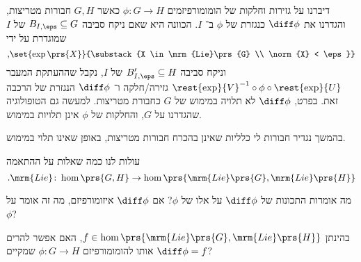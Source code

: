 \documentclass[10pt, twoside]{book}
\newcommand{\Lie}{\mrm{Lie}}
\begin{document}

\begin{remark}

דיברנו על גזירות וחלקות של הומומורפיזמים
$\phi \colon G \to H$
כאשר
$G,H$
חבורות מטריצות, והגדרנו את
$\diff \phi$
כנגזרת של
$\phi$
ב־%
$I$.
הכוונה היא שאם ניקח סביבה
$B_{I,\eps} \subseteq G$
של
$I$
שמוגדרת על ידי
\[\text{,}\set{\exp\prs{X}}{\substack{X \in \Lie\prs{G} \\ \norm{X} < \eps}}\]
וניקח סביבה
$B_{I,\eps}' \subseteq H$
של
$I$,
נקבל שההעתקת המעבר
$\rest{\exp}{V}^{-1} \circ \phi \circ \rest{\exp}{U}$
גזירה/חלקה ו־%
$\diff \phi$
הנגזרת של הרכבה זאת.
בפרט,
$\diff \phi$
לא תלויה במימוש של
$G$
כחבורת מטריצות.
למעשה גם הטופולוגיה שהגדרנו על
$G$,
והחלקות של
$\phi$
אינן תלויות במימוש.

בהמשך נגדיר חבורות לי כלליות שאינן בהכרח חבורות מטריצות, באופן שאינו תלוי במימוש.
\end{remark}


עולות לנו כמה שאלות על ההתאמה
\[\text{.}\Lie \colon \hom\prs{G,H} \to \hom\prs{\Lie\prs{G}, \Lie\prs{H}}\]

\begin{question}
מה אומרות התכונות של
$\diff \phi$
על אלו של
$\phi$?
אם
$\diff \phi$
איזומורפיזם, מה זה אומר על
$\phi$?
\end{question}

\begin{question}
בהינתן
$f \in \hom\prs{\Lie\prs{G}, \Lie\prs{H}}$,
האם אפשר להרים אותו להומומורפיזם
$\phi \colon G \to H$
שמקיים
$\diff \phi = f$?
\end{question}
\end{document}
